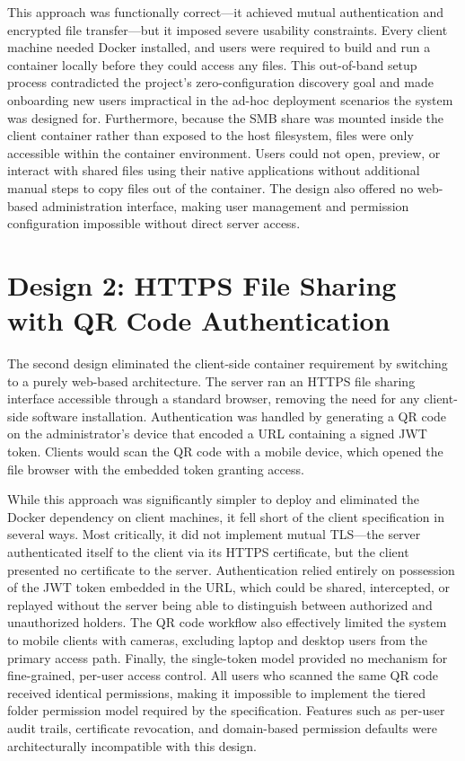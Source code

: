 \documentclass[12pt,letterpaper]{report}
\begin{document}
This approach was functionally correct---it achieved mutual authentication and encrypted file transfer---but it imposed severe usability constraints. Every client machine needed Docker installed, and users were required to build and run a container locally before they could access any files. This out-of-band setup process contradicted the project's zero-configuration discovery goal and made onboarding new users impractical in the ad-hoc deployment scenarios the system was designed for. Furthermore, because the SMB share was mounted inside the client container rather than exposed to the host filesystem, files were only accessible within the container environment. Users could not open, preview, or interact with shared files using their native applications without additional manual steps to copy files out of the container. The design also offered no web-based administration interface, making user management and permission configuration impossible without direct server access.

\section{Design 2: HTTPS File Sharing with QR Code Authentication}

The second design eliminated the client-side container requirement by switching to a purely web-based architecture. The server ran an HTTPS file sharing interface accessible through a standard browser, removing the need for any client-side software installation. Authentication was handled by generating a QR code on the administrator's device that encoded a URL containing a signed JWT token. Clients would scan the QR code with a mobile device, which opened the file browser with the embedded token granting access.

While this approach was significantly simpler to deploy and eliminated the Docker dependency on client machines, it fell short of the client specification in several ways. Most critically, it did not implement mutual TLS---the server authenticated itself to the client via its HTTPS certificate, but the client presented no certificate to the server. Authentication relied entirely on possession of the JWT token embedded in the URL, which could be shared, intercepted, or replayed without the server being able to distinguish between authorized and unauthorized holders. The QR code workflow also effectively limited the system to mobile clients with cameras, excluding laptop and desktop users from the primary access path. Finally, the single-token model provided no mechanism for fine-grained, per-user access control. All users who scanned the same QR code received identical permissions, making it impossible to implement the tiered folder permission model required by the specification. Features such as per-user audit trails, certificate revocation, and domain-based permission defaults were architecturally incompatible with this design.
\end{document}
